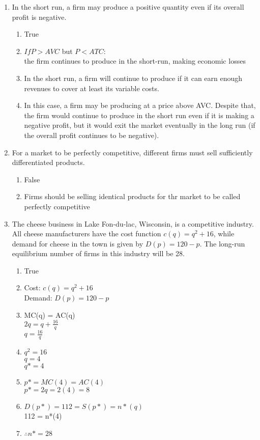 \documentclass[11pt]{article}
\begin{document}
\begin{enumerate}
\begin{enumerate}
\begin{enumerate}
    \end{enumerate}

    \item In the short run, a firm may produce a positive quantity even if its overall profit is negative.
    \begin{enumerate}
        \item True
        \item $If P > AVC$ but $P < ATC$:\\
        the firm continues to produce in the short-run, making economic losses
        \item In the short run, a firm will continue to produce if it can earn enough revenues to cover at least its variable costs. 
        \item In this case, a firm may be producing at a price above AVC. Despite that, the firm would continue to produce in the short run even if it is making a negative profit, but it would exit the market eventually in the long run (if the overall profit continues to be negative).
    \end{enumerate}

    \item For a market to be perfectly competitive, different firms must sell sufficiently differentiated products.
    \begin{enumerate}
        \item False
        \item Firms should be selling identical products for thr market to be called perfectly competitive
    \end{enumerate}

    \item The cheese business in Lake Fon-du-lac, Wisconsin, is a competitive industry. All cheese manufacturers have the cost function $c(q)=q^{2}+16$, while demand for cheese in the town is given by $D(p)=120-p$. The long-run equilibrium number of firms in this industry will be 28.
    \begin{enumerate}
        \item True
        \item Cost: $c(q)=q^{2}+16$\\
        Demand: $D(p)=120-p$
        \item MC(q) = AC(q)\\
        $2q = q+\frac{16}{q}$\\
        $q = \frac{16}{q}$
        \item $q^2 = 16$\\
        $q=4$\\
        $q* = 4$
        \item $p* = MC(4) = AC(4)$\\
        $p* = 2q = 2(4) = 8$
        \item $D(p*) = 112 = S(p*) = n*(q)$\\
        112 = n*(4)
        \item $\therefore n* = 28$
    \end{enumerate}
    \end{enumerate}


\end{enumerate}
\end{document}

